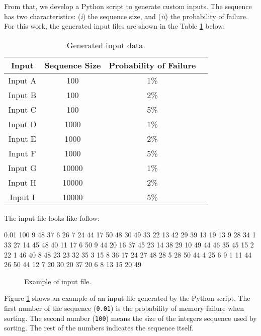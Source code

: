 From that, we develop a Python script to generate custom inputs. The sequence has two characteristics: (\textit{i}) the sequence size, and (\textit{ii}) the probability of failure. For this work, the generated input files are shown in the Table \ref{table-input-data} below.

\begin{table}[htbp]
    \caption{Generated input data.}
    \begin{center}
    \begin{tabular}{|c|c|c|c|}
    \hline
    \multirow{1}{*}{\textbf{Input}}&\textbf{Sequence Size}&\textbf{Probability of Failure} \\
    \hline
    Input A & 100 & 1\% \\
    Input B & 100 & 2\% \\
    Input C & 100 & 5\% \\
    \hline
    Input D & 1000 & 1\% \\
    Input E & 1000 & 2\% \\
    Input F & 1000 & 5\% \\
    \hline
    Input G & 10000 & 1\% \\
    Input H & 10000 & 2\% \\
    Input I & 10000 & 5\% \\
    \hline
    \end{tabular}
    \label{table-input-data}
    \end{center}
\end{table}

The input file looks like follow:

\begin{verbbox}[\mbox{}]
0.01 100 9 48 37 6 26 7 24 44 17 50 48 30 49 33 22 13 42 29 39 13 19 13 9 28 
34 1 33 27 14 45 48 40 11 17 6 50 9 44 20 16 37 45 23 14 38 29 10 49 44 46 35
45 15 2 22 1 46 40 8 48 23 23 32 35 3 15 8 36 17 24 27 48 28 5 28 50 44 4 25 
6 9 1 11 44 26 50 44 12 7 20 30 20 37 20 6 8 13 15 20 49
\end{verbbox}

\begin{figure}[hbtp]
    \centering
    \fbox{
    \theverbbox
    }
    \caption{Example of input file.}
    \label{input-file-example}
\end{figure}

Figure \ref{input-file-example} shows an example of an input file generated by the Python script. The first number of the sequence (\texttt{0.01}) is the probability of memory failure when sorting. The second number (\texttt{100}) means the size of the integers sequence used by sorting. The rest of the numbers indicates the sequence itself.